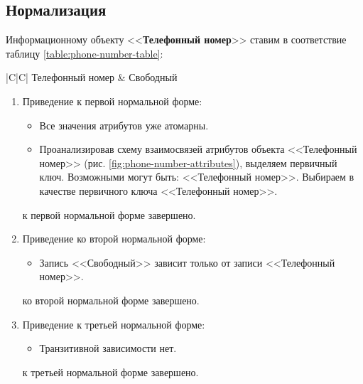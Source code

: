 \subsection{Нормализация}\label{normalization}



Информационному объекту <<\textbf{Телефонный номер}>> ставим в соответствие таблицу \ref{table:phone-number-table}:
\begin{table}[H]
    \caption{Таблица объекта <<Телефонный номер>>}
    \label{table:phone-number-table}
    \setlength{\parskip}{1.0ex}
    \renewcommand{\arraystretch}{1.5}
    \renewcommand{\tabularxcolumn}[1]{m{#1}}
    \begin{tabularx}{\textwidth}{|C|C|}
        \hline
        Телефонный номер & Свободный \\ \hline
    \end{tabularx}
\end{table}

\begin{enumerate}
    \item Приведение к первой нормальной форме:
    \begin{itemize}
        \item Все значения атрибутов уже атомарны.
        \item Проанализировав схему взаимосвязей атрибутов объекта <<Телефонный номер>> (рис. \ref{fig:phone-number-attributes}), выделяем первичный ключ. Возможными могут быть: <<Телефонный номер>>. Выбираем в качестве первичного ключа <<Телефонный номер>>.
    \end{itemize}
    \tab{} к первой нормальной форме завершено.

    \item Приведение ко второй нормальной форме:
    \begin{itemize}
        \item Запись <<Свободный>> зависит только от записи <<Телефонный номер>>.
    \end{itemize}
    \tab{} ко второй нормальной форме завершено.

    \item Приведение к третьей нормальной форме:
    \begin{itemize}
        \item Транзитивной зависимости нет.
    \end{itemize}
    \tab{} к третьей нормальной форме завершено.
\end{enumerate}

